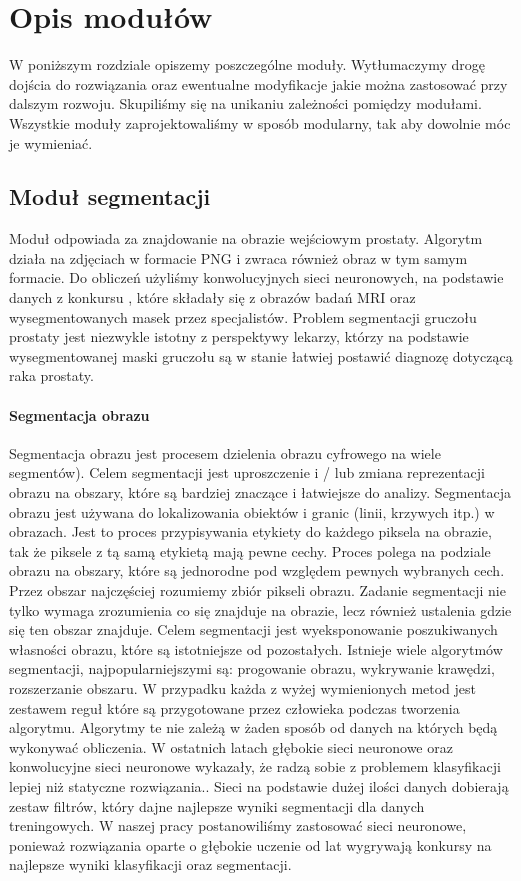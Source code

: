 \documentclass[a4paper,11pt,twoside]{report}
\theoremstyle{definition}
\begin{document}
\chapter{Opis modułów}

W poniższym rozdziale opiszemy poszczególne moduły. Wytłumaczymy drogę dojścia do rozwiązania oraz ewentualne modyfikacje jakie można zastosować przy dalszym rozwoju. Skupiliśmy się na unikaniu zależności pomiędzy modułami. Wszystkie moduły zaprojektowaliśmy w sposób modularny, tak aby dowolnie móc je wymieniać. 

\section{Moduł segmentacji}

Moduł odpowiada za znajdowanie na obrazie wejściowym prostaty. Algorytm działa na zdjęciach w formacie PNG i zwraca również obraz w tym samym formacie. Do obliczeń użyliśmy konwolucyjnych sieci neuronowych, na podstawie danych z konkursu \cite{konkurs}, które składały się  z obrazów badań MRI oraz wysegmentowanych masek przez specjalistów. Problem segmentacji gruczołu prostaty jest niezwykle istotny z perspektywy lekarzy, którzy na podstawie wysegmentowanej maski gruczołu są w stanie łatwiej postawić diagnozę dotyczącą raka prostaty.

\subsubsection{Segmentacja obrazu}

Segmentacja obrazu jest procesem dzielenia obrazu cyfrowego na wiele segmentów). Celem segmentacji jest uproszczenie i / lub zmiana reprezentacji obrazu na obszary, które są bardziej znaczące i łatwiejsze do analizy. Segmentacja obrazu jest używana do lokalizowania obiektów i granic (linii, krzywych itp.) w obrazach. Jest to proces przypisywania etykiety do każdego piksela na obrazie, tak że piksele z tą samą etykietą mają pewne cechy. Proces polega na podziale obrazu na  obszary, które są jednorodne pod względem pewnych wybranych cech. Przez obszar najczęściej rozumiemy zbiór pikseli obrazu. Zadanie segmentacji nie tylko wymaga zrozumienia co się znajduje na obrazie, lecz również ustalenia gdzie się ten obszar znajduje. Celem segmentacji jest wyeksponowanie  poszukiwanych własności obrazu, które są istotniejsze od pozostałych. Istnieje wiele algorytmów segmentacji, najpopularniejszymi są: progowanie obrazu, wykrywanie krawędzi, rozszerzanie obszaru. W przypadku każda z wyżej wymienionych metod jest zestawem reguł które są przygotowane przez człowieka podczas tworzenia algorytmu. Algorytmy te nie zależą w żaden sposób od danych na których będą wykonywać obliczenia. W ostatnich latach głębokie sieci neuronowe oraz konwolucyjne sieci neuronowe wykazały, że radzą sobie z problemem klasyfikacji lepiej niż statyczne rozwiązania.\cite{imageOrg}. Sieci na podstawie dużej ilości danych dobierają zestaw filtrów, który dajne najlepsze wyniki segmentacji dla danych treningowych. W naszej pracy postanowiliśmy zastosować sieci neuronowe, ponieważ rozwiązania oparte o głębokie uczenie od lat wygrywają konkursy na najlepsze wyniki  klasyfikacji oraz segmentacji. 
\end{document}
